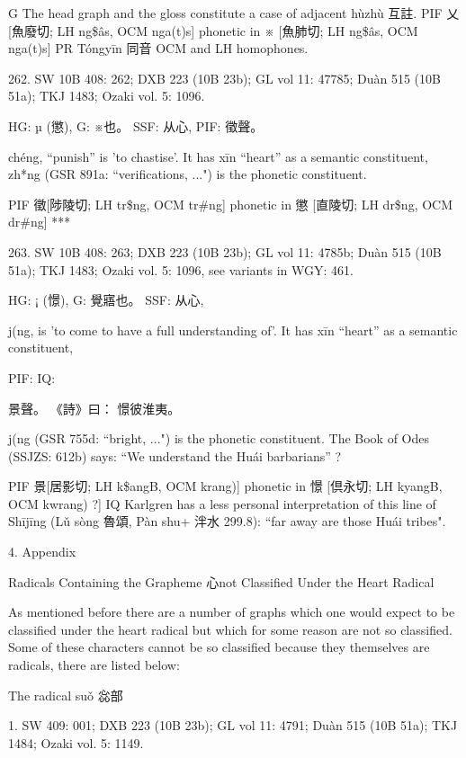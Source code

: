 G	The head graph and the gloss constitute a case of adjacent hùzhù 互註.
PIF     乂[魚廢切; LH ng\$âs, OCM nga(t)s] phonetic in ※ [魚肺切; LH ng\$âs, OCM nga(t)s]
PR	Tóngyīn 同音 OCM and LH homophones.

262. SW 10B 408: 262; DXB 223 (10B 23b); GL vol 11: 47785; Duàn 515 (10B 51a); TKJ 1483; Ozaki vol. 5: 1096.

HG: µ (懲),
G:	※也。
SSF: 从心,
PIF: 徵聲。


chéng, ``punish'' is 'to chastise'.
It has xīn ``heart'' as a semantic constituent,
zh*ng (GSR 891a: ``verifications, ...") is the phonetic constituent.

PIF     徵[陟陵切; LH tr\$ng, OCM tr\#ng] phonetic in 懲 [直陵切; LH dr\$ng, OCM dr\#ng]
***

263. SW 10B 408: 263; DXB 223 (10B 23b); GL vol 11: 4785b; Duàn 515 (10B 51a); TKJ 1483; Ozaki vol. 5: 1096, see
variants in WGY: 461.

HG:  ¡ (憬),
G:	覺寤也。
SSF: 从心,


j(ng,
is 'to come to have a full understanding of'. It has xīn ``heart'' as a semantic constituent,

PIF: IQ:

景聲。
《詩》曰： 憬彼淮夷。

j(ng (GSR 755d: ``bright, ...") is the phonetic constituent.
The Book of Odes (SSJZS: 612b) says: ``We understand the Huái barbarians'' ?

PIF     景[居影切; LH k\$angB, OCM krang)] phonetic in 憬 [倶永切; LH kyangB, OCM kwrang) ?]
IQ	Karlgren has a less personal interpretation of this line of Shījīng (Lǔ sòng 魯頌, Pàn shu+ 泮水 299.8): ``far away are those Huái tribes".










4. Appendix

Radicals Containing the Grapheme 心not Classified Under the Heart Radical


As mentioned before there are a number of graphs which one would expect to be classified under the heart radical but which for some reason are not so classified. Some of these characters cannot be so classified because they themselves are radicals, there are listed below:

The radical suǒ 惢部

1. SW 409: 001; DXB 223 (10B 23b); GL vol 11: 4791; Duàn 515 (10B 51a); TKJ 1484; Ozaki vol. 5: 1149.

